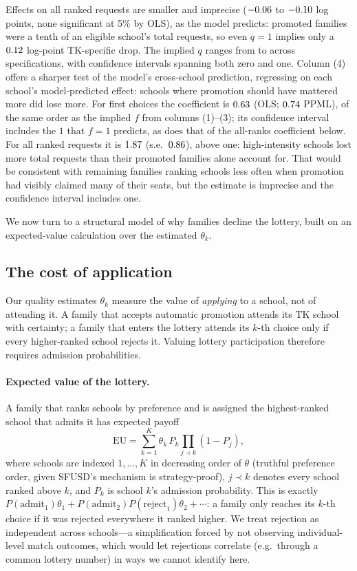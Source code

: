 \documentclass{article}
\begin{document}
Effects on all ranked requests are smaller and imprecise ($-0.06$ to $-0.10$ log points, none significant at 5\% by OLS), as the model predicts: promoted families were a tenth of an eligible school's total requests, so even $q = 1$ implies only a $0.12$ log-point TK-specific drop. The implied $q$ ranges from \numImpliedQMin{} to \numImpliedQMax{} across specifications, with confidence intervals spanning both zero and one. Column (4) offers a sharper test of the model's cross-school prediction, regressing on each school's model-predicted effect: schools where promotion should have mattered more did lose more. For first choices the coefficient is $0.63$ (OLS; $0.74$ PPML), of the same order as the implied $f$ from columns (1)--(3); its confidence interval includes the $1$ that $f = 1$ predicts, as does that of the all-ranks coefficient below. For all ranked requests it is $1.87$ (s.e.\ $0.86$), above one: high-intensity schools lost more total requests than their promoted families alone account for. That would be consistent with remaining families ranking schools less often when promotion had visibly claimed many of their seats, but the estimate is imprecise and the confidence interval includes one.

We now turn to a structural model of why families decline the lottery, built on an expected-value calculation over the estimated $\theta_k$.

\subsection{The cost of application}
\label{sec:cost-of-application}
Our quality estimates $\theta_k$ measure the value of \emph{applying} to a school, not of attending it. A family that accepts automatic promotion attends its TK school with certainty; a family that enters the lottery attends its $k$-th choice only if every higher-ranked school rejects it. Valuing lottery participation therefore requires admission probabilities.

\paragraph{Expected value of the lottery.} A family that ranks schools by preference and is assigned the highest-ranked school that admits it has expected payoff
\[
\mathrm{EU} = \sum_{k=1}^{K} \theta_k \, P_k \prod_{j \prec k} \left( 1 - P_j \right),
\]
where schools are indexed $1, \dots, K$ in decreasing order of $\theta$ (truthful preference order, given SFUSD's mechanism is strategy-proof), $j \prec k$ denotes every school ranked above $k$, and $P_k$ is school $k$'s admission probability. This is exactly $P(\text{admit}_1)\theta_1 + P(\text{admit}_2)P(\text{reject}_1)\theta_2 + \cdots$: a family only reaches its $k$-th choice if it was rejected everywhere it ranked higher. We treat rejection as independent across schools---a simplification forced by not observing individual-level match outcomes, which would let rejections correlate (e.g.\ through a common lottery number) in ways we cannot identify here.
\end{document}
